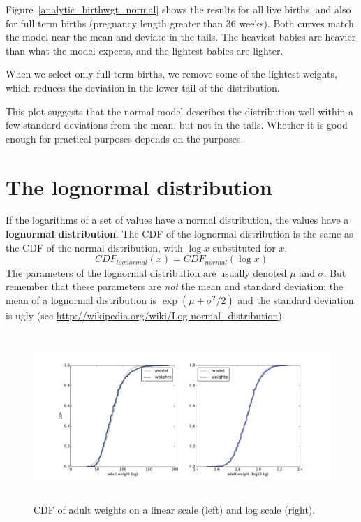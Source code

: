 \documentclass[12pt]{book}
\begin{document}
Figure~\ref{analytic_birthwgt_normal} shows the results for
all live births, and also for full term births (pregnancy length greater
than 36 weeks).  Both curves match the model near the mean and
deviate in the tails.  The heaviest babies are heavier than what
the model expects, and the lightest babies are lighter.

When we select only full term births, we remove some of the lightest
weights, which reduces the deviation in the lower tail of the
distribution.

This plot suggests that the normal model describes the distribution
well within a few standard deviations from the mean, but not in the
tails.  Whether it is good enough for practical purposes depends
on the purposes.


\section{The lognormal distribution}
\label{brfss}
\label{lognormal}

If the logarithms of a set of values have a normal distribution, the
values have a {\bf lognormal distribution}.  The CDF of the lognormal
distribution is the same as the CDF of the normal distribution,
with $\log x$ substituted for $x$.
%
\[ CDF_{lognormal}(x) = CDF_{normal}(\log x)\]
%
The parameters of the lognormal distribution are usually denoted
$\mu$ and $\sigma$.  But remember that these parameters are {\em not}
the mean and standard deviation; the mean of a lognormal distribution
is $\exp(\mu +\sigma^2/2)$ and the standard deviation is
ugly (see \url{http://wikipedia.org/wiki/Log-normal_distribution}).
  

\begin{figure}
\centerline{
\includegraphics[height=2.5in]{figs/brfss_weight.pdf}}
\caption{CDF of adult weights on a linear scale (left) and
log scale (right).}
\label{brfss_weight}
\end{figure}
\end{document}
